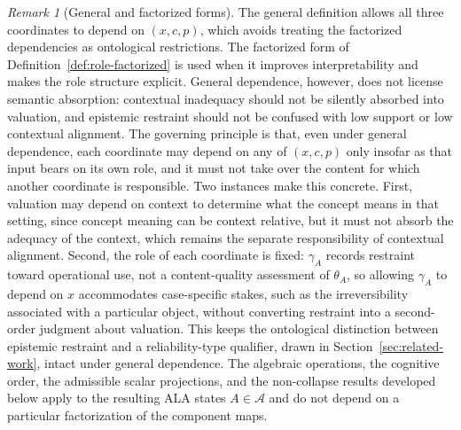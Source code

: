 \documentclass[reqno,final]{amsart}
\theoremstyle{definition}
\theoremstyle{plain}
\theoremstyle{remark}
\newtheorem{remark}{Remark}
\providecommand{\cA}{\mathcal{A}}
\begin{document}
\begin{remark}[General and factorized forms]
\label{rem:general-factorized}
The general definition allows all three coordinates to depend on \((x,c,p)\), which avoids treating the factorized dependencies as ontological restrictions. The factorized form of Definition~\ref{def:role-factorized} is used when it improves interpretability and makes the role structure explicit. General dependence, however, does not license semantic absorption: contextual inadequacy should not be silently absorbed into valuation, and epistemic restraint should not be confused with low support or low contextual alignment. The governing principle is that, even under general dependence, each coordinate may depend on any of \((x,c,p)\) only insofar as that input bears on its own role, and it must not take over the content for which another coordinate is responsible. Two instances make this concrete. First, valuation may depend on context to determine what the concept means in that setting, since concept meaning can be context relative, but it must not absorb the adequacy of the context, which remains the separate responsibility of contextual alignment. Second, the role of each coordinate is fixed: \(\gamma_A\) records restraint toward operational use, not a content-quality assessment of \(\theta_A\), so allowing \(\gamma_A\) to depend on \(x\) accommodates case-specific stakes, such as the irreversibility associated with a particular object, without converting restraint into a second-order judgment about valuation. This keeps the ontological distinction between epistemic restraint and a reliability-type qualifier, drawn in Section~\ref{sec:related-work}, intact under general dependence. The algebraic operations, the cognitive order, the admissible scalar projections, and the non-collapse results developed below apply to the resulting ALA states \(A\in\cA\) and do not depend on a particular factorization of the component maps.
\end{remark}
\end{document}
